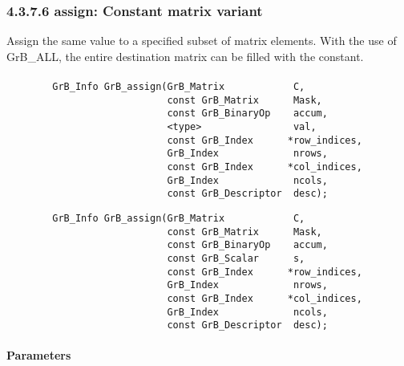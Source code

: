 



\subsubsection*{4.3.7.6 {\sf assign}: Constant matrix variant}

Assign the same value to a specified subset of matrix elements.  With the use of 
{\sf GrB\_ALL}, the entire destination matrix can be filled with the constant.

\paragraph{\syntax}

\begin{verbatim}
        GrB_Info GrB_assign(GrB_Matrix            C,
                            const GrB_Matrix      Mask,
                            const GrB_BinaryOp    accum,
                            <type>                val,
                            const GrB_Index      *row_indices,
                            GrB_Index             nrows,
                            const GrB_Index      *col_indices,
                            GrB_Index             ncols,
                            const GrB_Descriptor  desc);
\end{verbatim}

{\color{red}
\begin{verbatim}
        GrB_Info GrB_assign(GrB_Matrix            C,
                            const GrB_Matrix      Mask,
                            const GrB_BinaryOp    accum,
                            const GrB_Scalar      s,
                            const GrB_Index      *row_indices,
                            GrB_Index             nrows,
                            const GrB_Index      *col_indices,
                            GrB_Index             ncols,
                            const GrB_Descriptor  desc);
\end{verbatim}
}

\paragraph{Parameters}

